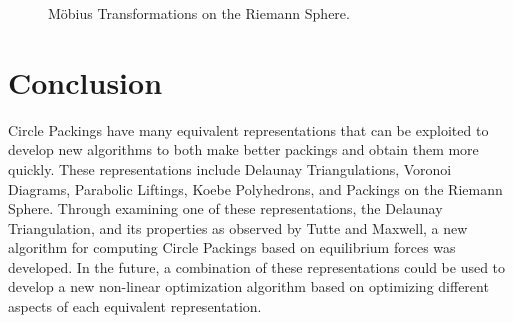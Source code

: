 \documentclass[11pt]{article}
\theoremstyle{definition}
\begin{document}
\begin{figure}[H]%
	\centering
	\qquad
	\caption[]{M\"{o}bius Transformations on the Riemann Sphere.}%
	\label{fig:mobiussphere}%
\end{figure}

\section{Conclusion}
Circle Packings have many equivalent representations that can be exploited to develop new algorithms to both make better packings and obtain them more quickly. These representations include Delaunay Triangulations, Voronoi Diagrams, Parabolic Liftings, Koebe Polyhedrons, and Packings on the Riemann Sphere. Through examining one of these representations, the Delaunay Triangulation, and its properties as observed by Tutte and Maxwell, a new algorithm for computing Circle Packings based on equilibrium forces was developed. In the future, a combination of these representations could be used to develop a new non-linear optimization algorithm based on optimizing different aspects of each equivalent representation.



\end{document}
